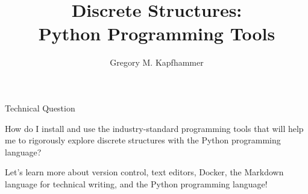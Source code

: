 \documentclass[14pt,aspectratio=169]{beamer}
\title{Discrete Structures: \\ Python Programming Tools}
\author{Gregory M. Kapfhammer}
\institute[shortinst]{Department of Computer Science, Allegheny College}
\begin{document}
{
  \begin{frame}
    \titlepage
  \end{frame}
}

\begin{frame}{Technical Question}

  \begin{center}
    {\large How do I install and use the industry-standard programming tools that will
    help me to rigorously explore discrete structures with the Python
  programming language?}
  \end{center}

  \vspace{2ex}

  \begin{center}
    \small Let's learn more about version control, text editors, Docker,
    the Markdown language for technical writing, and the Python programming
    language!
  \end{center}

\end{frame}
\end{document}

